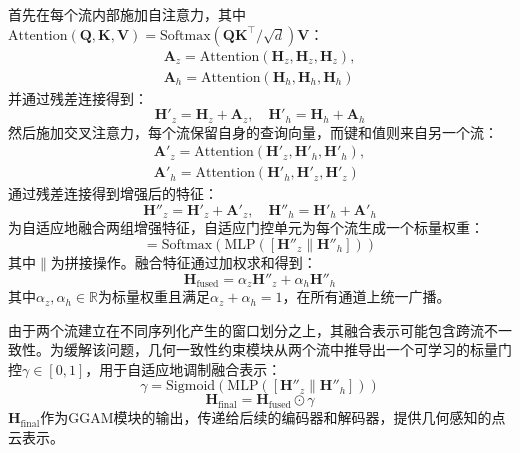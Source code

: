 \documentclass[12pt,a4paper,openany,oneside]{ctexbook}
\theoremstyle{definition}
\theoremstyle{remark}
\begin{document}
首先在每个流内部施加自注意力，其中$\text{Attention}(\mathbf{Q}, \mathbf{K}, \mathbf{V}) = \text{Softmax}(\mathbf{Q}\mathbf{K}^\top / \sqrt{d})\mathbf{V}$：
\begin{equation}
	\begin{aligned}
		\mathbf{A}_z = \text{Attention}(\mathbf{H}_z, \mathbf{H}_z, \mathbf{H}_z), \\
		\mathbf{A}_h = \text{Attention}(\mathbf{H}_h, \mathbf{H}_h, \mathbf{H}_h)
	\end{aligned}
\end{equation}
并通过残差连接得到：
\begin{equation}
	\mathbf{H}'_z = \mathbf{H}_z + \mathbf{A}_z, \quad \mathbf{H}'_h = \mathbf{H}_h + \mathbf{A}_h
\end{equation}
然后施加交叉注意力，每个流保留自身的查询向量，而键和值则来自另一个流：
\begin{equation}
	\begin{aligned}
		\mathbf{A}'_z = \text{Attention}(\mathbf{H}'_z, \mathbf{H}'_h, \mathbf{H}'_h), \\
		\mathbf{A}'_h = \text{Attention}(\mathbf{H}'_h, \mathbf{H}'_z, \mathbf{H}'_z)
	\end{aligned}
\end{equation}
通过残差连接得到增强后的特征：
\begin{equation}
	\mathbf{H}''_z = \mathbf{H}'_z + \mathbf{A}'_z, \quad \mathbf{H}''_h = \mathbf{H}'_h + \mathbf{A}'_h
\end{equation}
为自适应地融合两组增强特征，自适应门控单元为每个流生成一个标量权重：
\begin{equation}
	[\alpha_z, \alpha_h] = \text{Softmax}(\text{MLP}([\mathbf{H}''_z \| \mathbf{H}''_h]))
	\label{eq:adaptive_gate}
\end{equation}
其中$\|$为拼接操作。融合特征通过加权求和得到：
\begin{equation}
	\mathbf{H}_{\text{fused}} = \alpha_z \mathbf{H}''_z + \alpha_h \mathbf{H}''_h
	\label{eq:gated_fusion}
\end{equation}
其中$\alpha_z, \alpha_h \in \mathbb{R}$为标量权重且满足$\alpha_z + \alpha_h = 1$，在所有通道上统一广播。

由于两个流建立在不同序列化产生的窗口划分之上，其融合表示可能包含跨流不一致性。为缓解该问题，几何一致性约束模块从两个流中推导出一个可学习的标量门控$\gamma \in [0, 1]$，用于自适应地调制融合表示：
\begin{equation}
	\gamma = \text{Sigmoid}(\text{MLP}([\mathbf{H}''_z \| \mathbf{H}''_h]))
	\label{eq:consistency_factor}
\end{equation}
\begin{equation}
	\mathbf{H}_{\text{final}} = \mathbf{H}_{\text{fused}} \odot \gamma
	\label{eq:final_feature}
\end{equation}
$\mathbf{H}_{\text{final}}$作为GGAM模块的输出，传递给后续的编码器和解码器，提供几何感知的点云表示。
\end{document}
